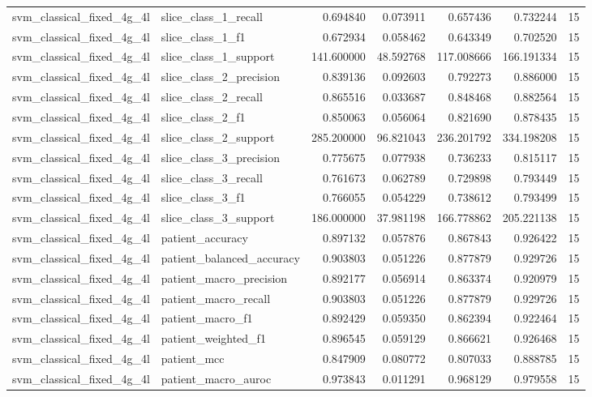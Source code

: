\begin{tabular}{llrrrrr}
svm_classical_fixed_4g_4l & slice_class_1_recall & 0.694840 & 0.073911 & 0.657436 & 0.732244 & 15 \\
svm_classical_fixed_4g_4l & slice_class_1_f1 & 0.672934 & 0.058462 & 0.643349 & 0.702520 & 15 \\
svm_classical_fixed_4g_4l & slice_class_1_support & 141.600000 & 48.592768 & 117.008666 & 166.191334 & 15 \\
svm_classical_fixed_4g_4l & slice_class_2_precision & 0.839136 & 0.092603 & 0.792273 & 0.886000 & 15 \\
svm_classical_fixed_4g_4l & slice_class_2_recall & 0.865516 & 0.033687 & 0.848468 & 0.882564 & 15 \\
svm_classical_fixed_4g_4l & slice_class_2_f1 & 0.850063 & 0.056064 & 0.821690 & 0.878435 & 15 \\
svm_classical_fixed_4g_4l & slice_class_2_support & 285.200000 & 96.821043 & 236.201792 & 334.198208 & 15 \\
svm_classical_fixed_4g_4l & slice_class_3_precision & 0.775675 & 0.077938 & 0.736233 & 0.815117 & 15 \\
svm_classical_fixed_4g_4l & slice_class_3_recall & 0.761673 & 0.062789 & 0.729898 & 0.793449 & 15 \\
svm_classical_fixed_4g_4l & slice_class_3_f1 & 0.766055 & 0.054229 & 0.738612 & 0.793499 & 15 \\
svm_classical_fixed_4g_4l & slice_class_3_support & 186.000000 & 37.981198 & 166.778862 & 205.221138 & 15 \\
svm_classical_fixed_4g_4l & patient_accuracy & 0.897132 & 0.057876 & 0.867843 & 0.926422 & 15 \\
svm_classical_fixed_4g_4l & patient_balanced_accuracy & 0.903803 & 0.051226 & 0.877879 & 0.929726 & 15 \\
svm_classical_fixed_4g_4l & patient_macro_precision & 0.892177 & 0.056914 & 0.863374 & 0.920979 & 15 \\
svm_classical_fixed_4g_4l & patient_macro_recall & 0.903803 & 0.051226 & 0.877879 & 0.929726 & 15 \\
svm_classical_fixed_4g_4l & patient_macro_f1 & 0.892429 & 0.059350 & 0.862394 & 0.922464 & 15 \\
svm_classical_fixed_4g_4l & patient_weighted_f1 & 0.896545 & 0.059129 & 0.866621 & 0.926468 & 15 \\
svm_classical_fixed_4g_4l & patient_mcc & 0.847909 & 0.080772 & 0.807033 & 0.888785 & 15 \\
svm_classical_fixed_4g_4l & patient_macro_auroc & 0.973843 & 0.011291 & 0.968129 & 0.979558 & 15 \\

\end{tabular}
